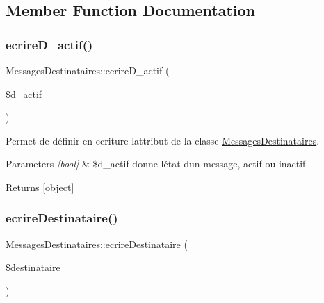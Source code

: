 \subsection{Member Function Documentation}
\mbox{\label{class_messages_destinataires_a7eb6aa2be8097b67dad0365625d9cc9c}} 
\subsubsection{\texorpdfstring{ecrire\+D\+\_\+actif()}{ecrireD\_actif()}}
{\footnotesize\ttfamily Messages\+Destinataires\+::ecrire\+D\+\_\+actif (\begin{DoxyParamCaption}\item[{}]{\$d\+\_\+actif }\end{DoxyParamCaption})}



Permet de définir en ecriture l\textquotesingle{}attribut de la classe \hyperlink{class_messages_destinataires}{Messages\+Destinataires}. 


\begin{DoxyParams}{Parameters}
{\em \mbox{[}bool\mbox{]}} & \$d\+\_\+actif donne l\textquotesingle{}état d\textquotesingle{}un message, actif ou inactif \\
\hline
\end{DoxyParams}
\begin{DoxyReturn}{Returns}
\mbox{[}object\mbox{]} 
\end{DoxyReturn}
\mbox{\label{class_messages_destinataires_ad7f35821dba9807a777bca63e47dd681}} 
\subsubsection{\texorpdfstring{ecrire\+Destinataire()}{ecrireDestinataire()}}
{\footnotesize\ttfamily Messages\+Destinataires\+::ecrire\+Destinataire (\begin{DoxyParamCaption}\item[{}]{\$destinataire }\end{DoxyParamCaption})}



